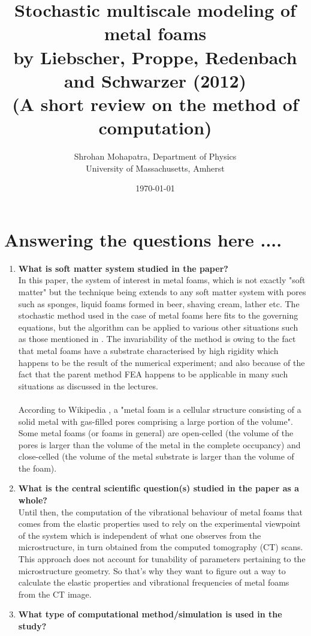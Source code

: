 \documentclass{article}
\title{Stochastic multiscale modeling of metal foams
\\ by Liebscher, Proppe, Redenbach and Schwarzer (2012) \cite{originalpaper}
\\ (A short review on the method of computation)}
\author{Shrohan Mohapatra, Department of Physics
\\ University of Massachusetts, Amherst}
\date{\today}
\begin{document}
\maketitle
\section*{Answering the questions here ....}
\begin{enumerate}
	\item \textbf{What is soft matter system studied in the paper?}\\
	In this paper, the system of interest in metal foams, which is not exactly "soft matter" but the technique being extends to any soft matter system with pores such as sponges, liquid foams formed in beer, shaving cream, lather etc. The stochastic method used in the case of metal foams here fits to the governing equations, but the algorithm can be applied to various other situations such as those mentioned in \cite{surveypaper}. The invariability of the method is owing to the fact that metal foams have a substrate characterised by high rigidity which happens to be the result of the numerical experiment; and also because of the fact that the parent method FEA happens to be applicable in many such situations as discussed in the lectures. \\ \\
	According to Wikipedia \cite{WikipediaLink}, a "metal foam is a cellular structure consisting of
a solid metal with gas-filled pores comprising a large portion of the volume". Some metal foams (or foams in general) are open-celled (the volume of the pores is larger than the volume of the metal in the complete occupancy) and close-celled (the volume of the metal substrate is larger than the volume of the foam).
	\item \textbf{What is the central scientific question(s) studied in the paper as a whole?}\\
	Until then, the computation of the vibrational behaviour of metal foams that comes from the elastic properties used to rely on the experimental viewpoint of the system which is independent of what one observes from the microstructure, in turn obtained from the computed tomography (CT) scans. This approach does not account for tunability of parameters pertaining to the microstructure geometry. So that's why they want to figure out a way to calculate the elastic properties and vibrational frequencies of metal foams from the CT image.
	\item \textbf{What type of computational method/simulation is used in the study?}\\

\end{enumerate}
\end{document}
